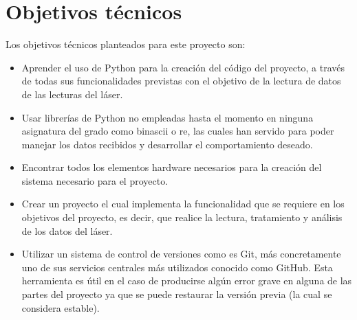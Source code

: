 \section{Objetivos técnicos}

Los objetivos técnicos planteados para este proyecto son:
\begin{itemize}
	\item Aprender el uso de Python para la creación del código del proyecto, a través de todas sus funcionalidades previstas con el objetivo de la lectura de datos de las lecturas del láser.
	\item Usar librerías de Python no empleadas hasta el momento en ninguna asignatura del grado como binascii o re, las cuales han servido para poder manejar los datos recibidos y desarrollar el comportamiento deseado.
	\item Encontrar todos los elementos hardware necesarios para la creación del sistema necesario para el proyecto.
	\item Crear un proyecto el cual implementa la funcionalidad que se requiere en los objetivos del proyecto, es decir, que realice la lectura, tratamiento y análisis de los datos del láser.
	\item Utilizar un sistema de control de versiones como es Git, más concretamente uno de sus servicios centrales más utilizados conocido como GitHub. Esta herramienta es útil en el caso de producirse algún error grave en alguna de las partes del proyecto ya que se puede restaurar la versión previa (la cual se considera estable).
\end{itemize}

